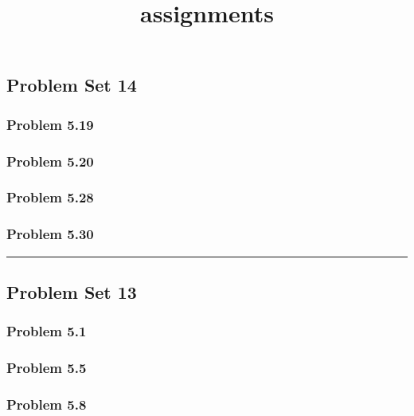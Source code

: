 \documentclass[11pt]{article}
\title{assignments}
\begin{document}
    
    \maketitle
    
    

    
    \subsection{Problem Set 14}\label{problem-set-14}

\subsubsection{Problem 5.19}\label{problem-5.19}

\subsubsection{Problem 5.20}\label{problem-5.20}

\subsubsection{Problem 5.28}\label{problem-5.28}

\subsubsection{Problem 5.30}\label{problem-5.30}

\begin{center}\rule{0.5\linewidth}{0.5pt}\end{center}

    \subsection{Problem Set 13}\label{problem-set-13}

\subsubsection{Problem 5.1}\label{problem-5.1}

\subsubsection{Problem 5.5}\label{problem-5.5}

\subsubsection{Problem 5.8}\label{problem-5.8}
\end{document}
